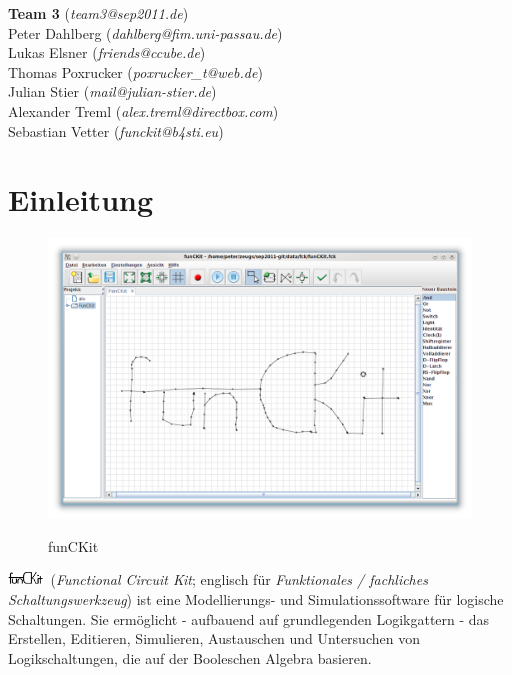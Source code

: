 \documentclass[12pt,a4paper]{scrartcl}
\newcommand{\funCKit}{\includegraphics[height=11pt]{../images/funCKit}}
\begin{document}
\begin{titlepage}
		{\noindent
			\textbf{Team 3} (\textit{team3@sep2011.de}) \\
			Peter Dahlberg (\textit{dahlberg@fim.uni-passau.de}) \\
			Lukas Elsner (\textit{friends@ccube.de}) \\
			Thomas Poxrucker (\textit{poxrucker\_t@web.de}) \\
			Julian Stier (\textit{mail@julian-stier.de}) \\
			Alexander Treml (\textit{alex.treml@directbox.com}) \\
			Sebastian Vetter (\textit{funckit@b4sti.eu})
		}

		\vspace{1cm}


		\color{black}
	\end{titlepage}

  \pagecolor{white}
  \tableofcontents

%


%

\newpage
\section{Einleitung}
		\begin{figure}[H]
			\centering
			\includegraphics[width=\linewidth]{images/funCKit.png}
			\label{fig:funckit-drawing}
			\caption{funCKit}
		\end{figure}
\funCKit~(\textit{Functional Circuit Kit}; englisch für \textit{Funktionales / fachliches Schaltungswerkzeug}) ist eine Modellierungs- und Simulationssoftware für logische Schaltungen. Sie ermöglicht - aufbauend auf grundlegenden Logikgattern - das Erstellen, Editieren, Simulieren, Austauschen und Untersuchen von Logikschaltungen, die auf der Booleschen Algebra basieren.
\end{document}
